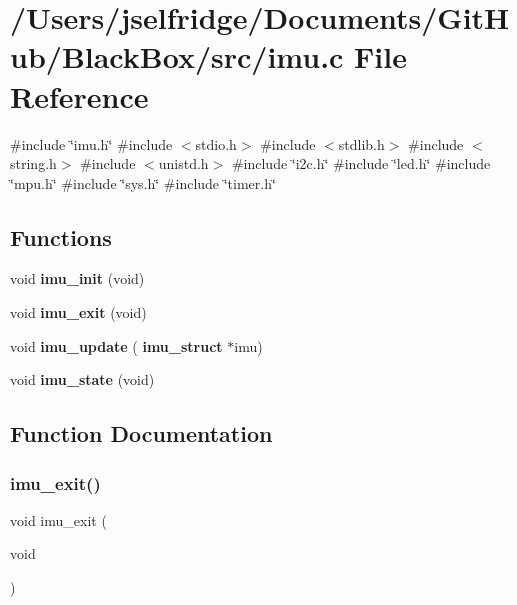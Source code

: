\section{/\+Users/jselfridge/\+Documents/\+Git\+Hub/\+Black\+Box/src/imu.c File Reference}
\label{imu_8c}
{\ttfamily \#include \char`\"{}imu.\+h\char`\"{}}\newline
{\ttfamily \#include $<$stdio.\+h$>$}\newline
{\ttfamily \#include $<$stdlib.\+h$>$}\newline
{\ttfamily \#include $<$string.\+h$>$}\newline
{\ttfamily \#include $<$unistd.\+h$>$}\newline
{\ttfamily \#include \char`\"{}i2c.\+h\char`\"{}}\newline
{\ttfamily \#include \char`\"{}led.\+h\char`\"{}}\newline
{\ttfamily \#include \char`\"{}mpu.\+h\char`\"{}}\newline
{\ttfamily \#include \char`\"{}sys.\+h\char`\"{}}\newline
{\ttfamily \#include \char`\"{}timer.\+h\char`\"{}}\newline
\subsection*{Functions}
\begin{DoxyCompactItemize}
\item 
void \textbf{ imu\+\_\+init} (void)
\item 
void \textbf{ imu\+\_\+exit} (void)
\item 
void \textbf{ imu\+\_\+update} (\textbf{ imu\+\_\+struct} $\ast$imu)
\item 
void \textbf{ imu\+\_\+state} (void)
\end{DoxyCompactItemize}


\subsection{Function Documentation}
\mbox{\label{imu_8c_adc3ee21523634d4aa99807b453f3afbd}} 
\subsubsection{imu\+\_\+exit()}
{\footnotesize\ttfamily void imu\+\_\+exit (\begin{DoxyParamCaption}\item[{void}]{ }\end{DoxyParamCaption})}

